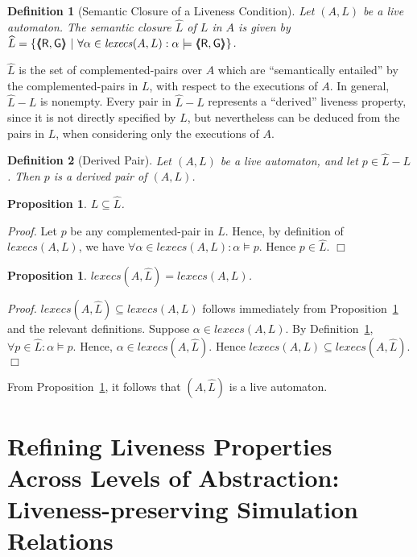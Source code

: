 \documentclass[11pt]{article}
\newcommand{\bp}{\begin{proposition}}
\newcommand{\ep}{\end{proposition}}
\newcommand{\bpr}{\begin{proof}}
\newcommand{\epr}{\end{proof}}
\newcommand{\bd}{\begin{definition}}
\newcommand{\ed}{\end{definition}}
\newcommand{\intrdef}{\emph}	\newcommand{\intr}{\emph}
\newcommand{\fa}{\forall}
\newcommand{\sat}{\models}
\newcommand{\G}{\mathsf{G}}
\newcommand{\R}{\mathsf{R}}
\newcommand{\pair}[2]{\lpb #1, #2 \rpb}
\newcommand{\lpb}{\langle \hspace{-0.34em} \langle \hspace{-0.34em} \langle}
\newcommand{\rpb}{\rangle \hspace{-0.34em} \rangle \hspace{-0.34em} \rangle}
\newcommand{\al}{\alpha}
\newcommand{\clos}[1]{\widehat{{#1}}}	\newcommand{\esig}{\mathit{esig}}
\newcommand{\execs}{\mathit{lexecs}}
\newtheorem{proposition}[theorem]{Proposition}
\newtheorem{definition}{Definition}
\newenvironment{proof}{\vspace{-1.0ex}\textit{Proof.} }
                      {\hfill{$\Box$}}
\begin{document}
\bd[Semantic Closure of a Liveness Condition]
\label{def:closure}
Let $(A,L)$ be a live automaton. 
The semantic closure $\clos{L}$ of $L$ in $A$ is given by
$\clos{L} =  \{ \pair{\R}{\G} ~|~ \fa \al \in \execs(A,L): \al \sat \pair{\R}{\G} \}$.
\ed


$\clos{L}$ is the set of complemented-pairs over $A$ which are ``semantically
entailed'' by the complemented-pairs in $L$, with respect to the executions of $A$.
In general, $\clos{L} - L$ is nonempty.
Every pair in $\clos{L} - L$ represents a ``derived'' liveness property, since it
is not directly specified by $L$, but nevertheless can be deduced from the
pairs in $L$, when considering only the executions of $A$.


\bd[Derived Pair]
\label{def:derived-pair}
Let $(A,L)$ be a live automaton, and let $p \in \clos{L} - L$.
Then $p$ is a \intrdef{derived pair} of $(A,L)$.
\ed

\bp
$L \subseteq \clos{L}$.
\label{prop:clos}
\ep
\bpr
Let $p$ be any complemented-pair in $L$.
Hence, by definition of $\execs(A,L)$, we have 
$\fa \al \in \execs(A,L): \al \sat p$. Hence $p \in \clos{L}$.
\epr


\bp
$\execs(A,\clos{L}) = \execs(A,L)$.
\label{prop:execs-clos}
\ep
\bpr
$\execs(A,\clos{L}) \subseteq \execs(A,L)$ follows immediately from 
Proposition~\ref{prop:clos} and the relevant definitions.
Suppose $\al \in \execs(A,L)$. 
By Definition~\ref{def:closure}, $\fa p \in \clos{L}: \al \sat p$.
Hence, $\al \in \execs(A,\clos{L})$.
Hence $\execs(A,L) \subseteq \execs(A,\clos{L})$.
\epr

From Proposition~\ref{prop:execs-clos}, it follows that $(A,\clos{L})$ is
a live automaton.





\section{Refining Liveness Properties Across Levels of Abstraction: Liveness-preserving
	 Simulation Relations}
\label{sec:sim-rels}
\end{document}
